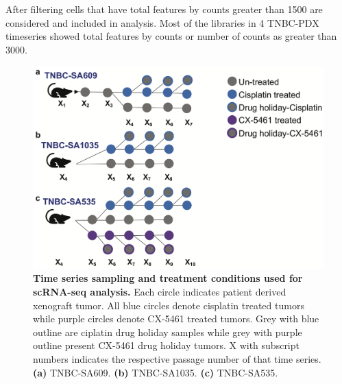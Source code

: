 
After filtering cells that have total features by counts greater than 1500 are considered and included in analysis. Most of the libraries in 4 TNBC-PDX timeseries showed total features by counts or number of counts as greater than 3000. 



\begin{figure}
\centering
\includegraphics[width=\textwidth]{Figures/chap5/SchematicsforRNAsampling.png}
	
\caption[SchematicsforRNAsampling]
	{\small
	\textbf{Time series sampling and treatment conditions used for scRNA-seq analysis.}
	Each circle indicates patient derived xenograft tumor. All blue circles denote cisplatin treated tumors while purple circles denote CX-5461 treated tumors. Grey with blue outline are ciplatin drug holiday samples while grey with purple outline present CX-5461 drug holiday tumors. X with subscript numbers indicates the respective passage number of that time series. 
	   \textbf{(a)} TNBC-SA609.
	    \textbf{(b)} TNBC-SA1035.
	    \textbf{(c)} TNBC-SA535.
	}
	\label{fig:RNAsampletree}
\end{figure}

